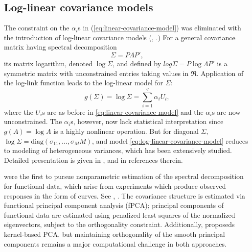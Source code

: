 \subsection{Log-linear covariance models} \label{log-linear-glms}

The constraint on the $\alpha_i$s in (\ref{eq:linear-covariance-model}) was eliminated with the introduction of log-linear covariance models (\cite{chiu1996matrix},  \cite{pinheiro1996unconstrained}.) For a general covariance matrix having spectral decomposition
\begin{equation}
\Sigma = P \Lambda P',
\end{equation}
\noindent
its matrix logarithm, denoted $\log\Sigma$, and defined by $log \Sigma = P \log\Lambda P'$ is a symmetric matrix with unconstrained entries taking values in $\Re$. Application of the log-link function leads to the log-linear model for $\Sigma$:
\begin{equation} \label{eq:log-linear-covariance-model}
g\left(\Sigma\right)  = \log\Sigma  = \sum_{i = 1}^q \alpha_i U_i, 
\end{equation}
\noindent
where the $U_i$s are as before in \ref{eq:linear-covariance-model} and the $\alpha_i$s are now unconstrained. The $\alpha_i$s, however, now lack statistical interpretation since $g\left(A\right) = \log A$ is a highly nonlinear operation. But for diagonal $\Sigma$, $\log \Sigma = \mbox{diag}\left(\sigma_{11},\dots, \sigma_MM\right)$, and model \ref{eq:log-linear-covariance-model} reduces to modeling of heterogeneous variances, which has been extensively studied. Detailed presentation is given in \cite{carroll1988transformation}, \cite{verbyla1993modelling} and in references therein. 

\bigskip

\cite{rice1991estimating} were the first to pursue nonparametric estimation of the spectral decomposition for functional data, which arise from experiments which produce observed responses in the form of curves. See \cite{ramsay2006functional}, \cite{ramsay2007applied}. The covariance structure is estimated via functional principal component analysis (fPCA); principal components of functional data are estimated using penalized least squares of the normalized eigenvectors, subject to the orthogonality constraint. Additionally, \cite{boente2000kernel} proposeds kernel-based PCA, but maintaining orthogonality of the smooth principal components remains a major computational challenge in both approaches.

